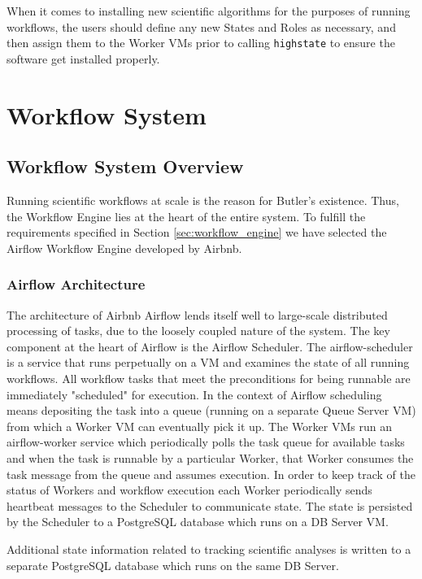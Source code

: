 When it comes to installing new scientific algorithms for the purposes of running workflows, the users should define any new States and Roles as necessary, and then assign them to the Worker VMs prior to calling \texttt{highstate} to ensure the software get installed properly. 

\section{Workflow System}\label{sec:design_workflow_system}
\subsection{Workflow System Overview}
Running scientific workflows at scale is the reason for Butler's existence. Thus, the Workflow Engine lies at the heart of the entire system. To fulfill the requirements specified in Section \ref{sec:workflow_engine} we have selected the Airflow Workflow Engine developed by Airbnb. 

\subsubsection {Airflow Architecture}

The architecture of Airbnb Airflow lends itself well to large-scale distributed processing of tasks, due to the loosely coupled nature of the system. The key component at the heart of Airflow is the Airflow Scheduler. The airflow-scheduler is a service that runs perpetually on a VM and examines the state of all running workflows. All workflow tasks that meet the preconditions for being runnable are immediately "scheduled" for execution. In the context of Airflow scheduling means depositing the task into a queue (running on a separate Queue Server VM) from which a Worker VM can eventually pick it up. The Worker VMs run an airflow-worker service which periodically polls the task queue for available tasks and when the task is runnable by a particular Worker, that Worker consumes the task message from the queue and assumes execution. In order to keep track of the status of Workers and workflow execution each Worker periodically sends heartbeat messages to the Scheduler to communicate state. The state is persisted by the Scheduler to a PostgreSQL database which runs on a DB Server VM.

Additional state information related to tracking scientific analyses is written to a separate PostgreSQL database which runs on the same DB Server.

